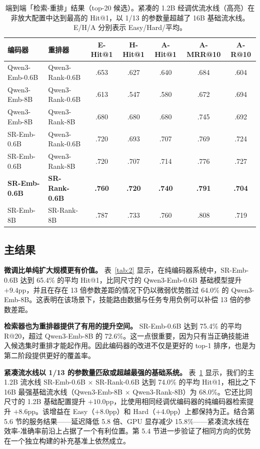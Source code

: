 \documentclass[11pt,UTF8,fontset=fandol]{ctexart}
\makeatletter
\newcommand{\Hit}{Hit@1}
\makeatother
\begin{document}
\begin{table}[H]\centering
\caption{端到端「检索-重排」结果（top-20 候选）。紧凑的 1.2B 经调优流水线（高亮）在非放大配置中达到最高的 \Hit{}，以 1/13 的参数量超越了 16B 基础流水线。E/H/A 分别表示 Easy/Hard/平均。}
\begin{tabular}{llccccc}
\toprule
编码器 & 重排器 & E-\Hit{} & H-\Hit{} & A-\Hit{} & A-MRR@10 & A-R@10 \\ \midrule
Qwen3-Emb-0.6B & Qwen3-Rank-0.6B & .653 & .627 & .640 & .684 & .604 \\
Qwen3-Emb-8B & Qwen3-Rank-0.6B & .613 & .547 & .580 & .672 & .694 \\
Qwen3-Emb-8B & Qwen3-Rank-8B & .680 & .680 & .680 & .745 & .692 \\
SR-Emb-0.6B & Qwen3-Rank-0.6B & .720 & .693 & .707 & .769 & .724 \\
SR-Emb-0.6B & Qwen3-Rank-8B & .720 & .707 & .714 & .776 & .727 \\
\textbf{SR-Emb-0.6B} & \textbf{SR-Rank-0.6B} & \textbf{.760} & \textbf{.720} & \textbf{.740} & \textbf{.791} & \textbf{.704} \\
SR-Emb-8B & SR-Rank-8B & .787 & .733 & .760 & .808 & .719 \\
\bottomrule
\end{tabular}
\label{tab:3}
\end{table}

\subsection{主结果}

\textbf{微调比单纯扩大规模更有价值。} 表~\ref{tab:2} 显示，在纯编码器系统中，SR-Emb-0.6B 达到 65.4\% 的平均 \Hit{}，比同尺寸的 Qwen3-Emb-0.6B 基础模型提升 $+9.4$pp，并且在存在 13 倍参数差距的情况下仍以微弱优势胜过 64.0\% 的 Qwen3-Emb-8B。这表明在该场景下，技能路由数据与任务专用负例可以补偿 13 倍的参数差距。

\textbf{检索器也为重排器提供了有用的提升空间。} SR-Emb-0.6B 达到 75.4\% 的平均 R@20，超过 Qwen3-Emb-8B 的 72.6\%。这一点很重要，因为只有当正确技能进入候选集时重排才能起作用。因此编码器的改进不仅是更好的 top-1 排序，也是为第二阶段提供更好的覆盖率。

\textbf{紧凑流水线以 1/13 的参数量匹敌或超越最强的基础系统。} 表~\ref{tab:3} 显示，我们的主 1.2B 流水线 SR-Emb-0.6B $\times$ SR-Rank-0.6B 达到 74.0\% 的平均 \Hit{}，相比之下 16B 最强基础流水线（Qwen3-Emb-8B $\times$ Qwen3-Rank-8B）为 68.0\%。它还比同尺寸的 1.2B 基础配置提升 $+10.0$pp，比使用相同经调优编码器的纯编码器检索提升 $+8.6$pp。该增益在 Easy（$+8.0$pp）和 Hard（$+4.0$pp）上都保持为正。结合第 5.6 节的服务结果——延迟降低 5.8 倍、GPU 显存减少 15.8\%——紧凑流水线在效率-准确率前沿上占据了一个有利位置。第 5.4 节进一步验证了相同方向的优势在一个独立构建的补充基准上依然成立。
\end{document}
